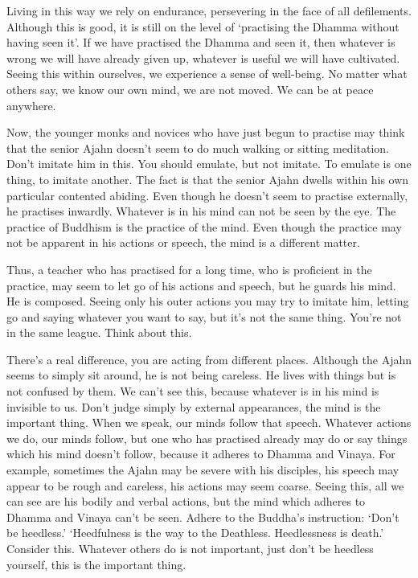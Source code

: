 Living in this way we rely on endurance, persevering in the face of all defilements. Although this is good, it is still on the level of `practising the Dhamma without having seen it'. If we have practised the Dhamma and seen it, then whatever is wrong we will have already given up, whatever is useful we will have cultivated. Seeing this within ourselves, we experience a sense of well-being. No matter what others say, we know our own mind, we are not moved. We can be at peace anywhere.

Now, the younger monks and novices who have just begun to practise may think that the senior Ajahn doesn't seem to do much walking or sitting meditation. Don't imitate him in this. You should emulate, but not imitate. To emulate is one thing, to imitate another. The fact is that the senior Ajahn dwells within his own particular contented abiding. Even though he doesn't seem to practise externally, he practises inwardly. Whatever is in his mind can not be seen by the eye. The practice of Buddhism is the practice of the mind. Even though the practice may not be apparent in his actions or speech, the mind is a different matter.

Thus, a teacher who has practised for a long time, who is proficient in the practice, may seem to let go of his actions and speech, but he guards his mind. He is composed. Seeing only his outer actions you may try to imitate him, letting go and saying whatever you want to say, but it's not the same thing. You're not in the same league. Think about this.

There's a real difference, you are acting from different places. Although the Ajahn seems to simply sit around, he is not being careless. He lives with things but is not confused by them. We can't see this, because whatever is in his mind is invisible to us. Don't judge simply by external appearances, the mind is the important thing. When we speak, our minds follow that speech. Whatever actions we do, our minds follow, but one who has practised already may do or say things which his mind doesn't follow, because it adheres to Dhamma and Vinaya. For example, sometimes the Ajahn may be severe with his disciples, his speech may appear to be rough and careless, his actions may seem coarse. Seeing this, all we can see are his bodily and verbal actions, but the mind which adheres to Dhamma and Vinaya can't be seen. Adhere to the Buddha's instruction: `Don't be heedless.' `Heedfulness is the way to the Deathless. Heedlessness is death.' Consider this. Whatever others do is not important, just don't be heedless yourself, this is the important thing.

